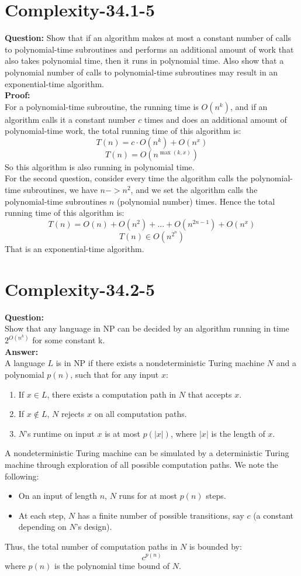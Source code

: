 \documentclass[12pt]{article}
\begin{document}
\section{Complexity-34.1-5}
\textbf{Question:} Show that if an algorithm makes at most a constant number of calls to polynomial-time subroutines and performs an additional amount of work that also takes polynomial time, then it runs in polynomial time. Also show that a polynomial number of
calls to polynomial-time subroutines may result in an exponential-time algorithm.\\
\textbf{Proof:}\\
For a polynomial-time subroutine, the running time is \(O(n^k)\), and if an algorithm calls it a constant number \(c\) times and does an additional amount of polynomial-time work, the total running time of this algorithm is:
\[T(n) = c \cdot O(n^k) + O(n^x)\]
\[T(n) = O(n^{\max(k,x)}) \]
So this algorithm is also running in polynomial time. \\
For the second question, consider every time the algorithm calls the polynomial-time subroutines, we have \(n->n^2\), and we set the algorithm calls the polynomial-time subroutines \(n\) (polynomial number) times.
Hence the total running time of this algorithm is:
\[T(n) = O(n) + O(n^2) + ...+O(n^{2n-1}) + O(n^x) \]
\[T(n) \in O(n^{2^n})\]
That is an exponential-time algorithm.



\section{Complexity-34.2-5}
\textbf{Question:}\\
Show that any language in NP can be decided by an algorithm running in time $2^{O(n^k)}$ for some constant k.\\
\textbf{Answer:}\\
A language \(L\) is in \(\text{NP}\) if there exists a nondeterministic Turing machine \(N\) and a polynomial \(p(n)\), such that for any input \(x\):
\begin{enumerate}
    \item If \(x \in L\), there exists a computation path in \(N\) that accepts \(x\).
    \item If \(x \notin L\), \(N\) rejects \(x\) on all computation paths.
    \item \(N\)'s runtime on input \(x\) is at most \(p(|x|)\), where \(|x|\) is the length of \(x\).
\end{enumerate}
A nondeterministic Turing machine can be simulated by a deterministic Turing machine through exploration of all possible computation paths. We note the following:
\begin{itemize}
    \item On an input of length \(n\), \(N\) runs for at most \(p(n)\) steps.
    \item At each step, \(N\) has a finite number of possible transitions, say \(c\) (a constant depending on \(N\)'s design).
\end{itemize}
Thus, the total number of computation paths in \(N\) is bounded by:
\[
c^{p(n)}
\]
where \(p(n)\) is the polynomial time bound of \(N\).
\end{document}
